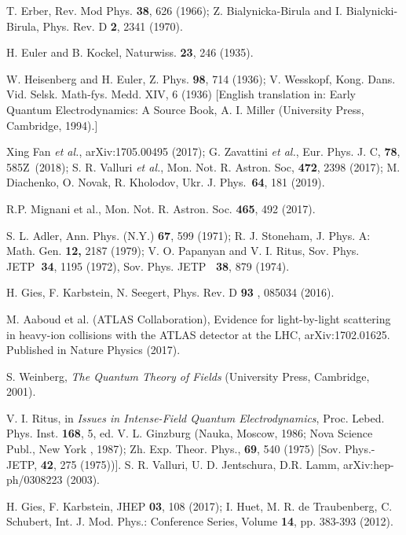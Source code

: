 \documentclass[12pt]{article}
\begin{document}
\begin{thebibliography}{99}
 T. Erber, Rev. Mod Phys. \textbf{38}, 626 (1966); Z.
Bialynicka-Birula and I. Bialynicki-Birula, Phys. Rev. D \textbf{2}, 2341
(1970).

 H. Euler and B. Kockel, Naturwiss. \textbf{23}, 246
(1935).

 W. Heisenberg and H. Euler, Z. Phys. \textbf{98}, 714
(1936); V. Wesskopf, Kong. Dans. Vid. Selsk. Math-fys. Medd. XIV, 6 (1936)
[English translation in: Early Quantum Electrodynamics: A Source Book, A. I.
Miller (University Press, Cambridge, 1994).]

 Xing Fan \textit{et al.}, arXiv:1705.00495 (2017);
G. Zavattini \textit{et al.}, Eur. Phys. J. C, \textbf{78}, 585Z\ (2018); S.
R. Valluri \textit{et al.}, Mon. Not. R. Astron. Soc, \textbf{472}, 2398
(2017); M. Diachenko, O. Novak, R. Kholodov, Ukr. J. Phys.\ \textbf{64}, 181
(2019).

 R.P. Mignani et al., Mon. Not. R. Astron. Soc. 
\textbf{465}, 492 (2017).

 S. L. Adler, Ann. Phys. (N.Y.) \textbf{67}, 599 (1971); R.
J. Stoneham, J. Phys. A: Math. Gen. \textbf{12, }2187 (1979); V. O. Papanyan
and V. I. Ritus, Sov. Phys. JETP\textbf{\ 34}, 1195 (1972), Sov. Phys. JETP%
\textbf{\ 38}, 879 (1974).


 H. Gies, F. Karbstein, N. Seegert, Phys. Rev. D \textbf{93}%
, 085034 (2016).

 M. Aaboud et al. (ATLAS Collaboration), Evidence for
light-by-light scattering in heavy-ion collisions with the ATLAS detector at
the LHC, arXiv:1702.01625. Published in Nature Physics (2017).

 {S. Weinberg, \emph{The Quantum Theory of Fields}
(University Press, Cambridge, 2001}).

 V. I. Ritus, in \textit{Issues in Intense-Field Quantum
Electrodynamics}, Proc. Lebed. Phys. Inst. \textbf{168}, 5, ed. V. L.
Ginzburg (Nauka, Moscow, 1986; Nova Science Publ., New York , 1987); Zh.
Exp. Theor. Phys., \textbf{69}, 540 (1975) [Sov. Phys.- JETP, \textbf{42},
275 (1975))]. S. R. Valluri, U. D. Jentschura, D.R. Lamm,
arXiv:hep-ph/0308223 (2003).

 H. Gies, F. Karbstein, JHEP \textbf{03}, 108 (2017); I. Huet,
M. R. de Traubenberg, C. Schubert, Int. J. Mod. Phys.: Conference Series,
Volume \textbf{14}, pp. 383-393 (2012).


\end{thebibliography}
\end{document}
